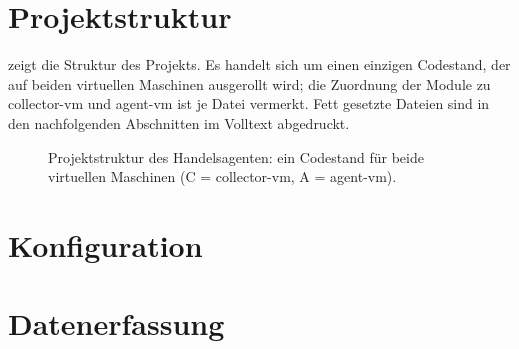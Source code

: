 \section{Projektstruktur}
\label{sec:anhang-projektstruktur}

 zeigt die Struktur des Projekts. Es handelt sich um
einen einzigen Codestand, der auf beiden virtuellen Maschinen ausgerollt wird;
die Zuordnung der Module zu collector-vm und agent-vm ist je Datei vermerkt.
Fett gesetzte Dateien sind in den nachfolgenden Abschnitten im Volltext
abgedruckt.

\begin{figure}[htbp]
    \centering
    
    \caption[Projektstruktur des Handelsagenten]{Projektstruktur des
        Handelsagenten: ein Codestand für beide virtuellen Maschinen
        (C = collector-vm, A = agent-vm).\quelleeigenki}
    \label{fig:projektstruktur}
\end{figure}

\section{Konfiguration}
\label{sec:anhang-konfiguration}





\section{Datenerfassung}
\label{sec:anhang-datenerfassung}





